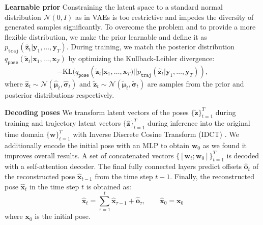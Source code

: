 \documentclass[10pt,twocolumn,letterpaper]{article}
\newcommand{\code}[1]{\texttt{#1}}
\renewcommand{\bar}[1]{\widetilde{#1}}
\renewcommand{\hat}[1]{\widehat{#1}}
\renewcommand{\paragraph}[1]{\noindent\textbf{#1}\enskip}
\begin{document}
\paragraph{Learnable prior}
Constraining the latent space to a standard normal distribution $\mathcal{N}(0, I)$ as in VAEs is too restrictive and impedes the diversity of generated samples significantly. To overcome the problem and to provide a more flexible distribution, we make the prior learnable \cite{denton2018stochastic, zheng2019pluralistic} and define it as $p_\code{traj}(\hat{\mathbf{z}}_t | \mathbf{y}_1, \dots, \mathbf{y}_T)$. During training, we match the posterior distribution $q_\code{pose}(\bar{\mathbf{z}}_t | \mathbf{x}_1, \dots, \mathbf{x}_T)$ by optimizing the Kullback-Leibler divergence: 
\begin{equation*}
    -\text{KL}(q_\code{pose}(\bar{\mathbf{z}}_t | \mathbf{x}_1, \dots, \mathbf{x}_T)||p_\code{traj}(\hat{\mathbf{z}}_t | \mathbf{y}_1, \dots, \mathbf{y}_T)),
\end{equation*}
where $\hat{\mathbf{z}}_t \sim \mathcal{N}(\hat{\bm{\mu}}_t, \hat{\bm{\sigma}}_t)$ and $\bar{\mathbf{z}}_t \sim \mathcal{N}(\bar{\bm{\mu}}_t, \bar{\bm{\sigma}}_t)$  are samples from the prior and posterior distributions respectively.

\paragraph{Decoding poses}
We transform latent vectors of the poses $\{\bar{\mathbf{z}}\}^T_{t=1}$ during training and trajectory latent vectors $\{\hat{\mathbf{z}}\}^T_{t=1}$ during inference into the original time domain $\{\mathbf{w}\}_{t=1}^T$ with Inverse Discrete Cosine Transform (IDCT) \cite{ahmed1974discrete}. 
We additionally encode the initial pose with an MLP to obtain $\mathbf{w}_0$ as we found it improves overall results. A set of concatenated vectors
$\{[\mathbf{w}_t; \mathbf{w}_0]\}^T_{t=1}$ is decoded with a self-attention
decoder. The final fully connected layers predict offsets $\hat{\mathbf{o}}_t$
of the reconstructed pose $\hat{\mathbf{x}}_{t-1}$ from the time step $t-1$.
Finally, the reconstructed pose $\hat{\mathbf{x}}_t$ in the time step $t$ is obtained as:
\begin{equation}
    \hat{\mathbf{x}}_t = \sum_{\tau=1}^{t}\hat{\mathbf{x}}_{\tau -1} + \hat{\mathbf{o}}_\tau, \qquad \hat{\mathbf{x}}_0 = \mathbf{x}_0
\end{equation}
where $\mathbf{x}_0$ is the initial pose. 
\end{document}
